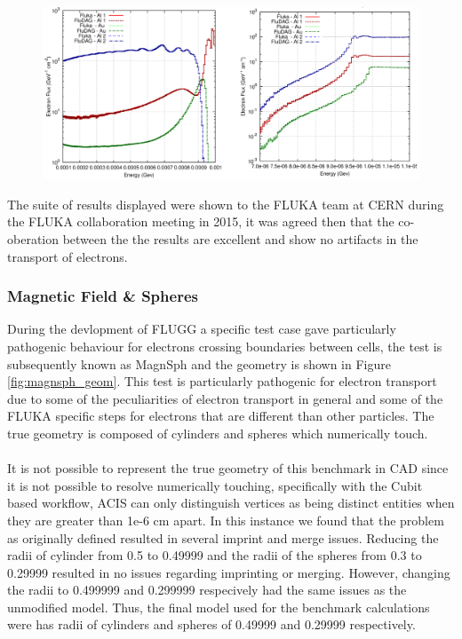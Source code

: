 \begin{figure}[ht!]
 \begin{centering}
 \centering
 \includegraphics[width=0.7\paperwidth]{../figs/alaual_spectra_log_log.png}
 \caption{}
 \label{fig:alaual_spectra_loglog}
 \end{centering}
\end{figure}

The suite of results displayed were shown to the FLUKA team at CERN during the FLUKA collaboration meeting
in 2015, it was agreed then that the co-oberation between the the results are excellent and show no artifacts
in the transport of electrons. 

\clearpage
\subsubsection{Magnetic Field \& Spheres}
During the devlopment of FLUGG a specific test case gave particularly pathogenic behaviour for electrons crossing
boundaries between cells, the test is subsequently known as MagnSph and the geometry is shown in Figure 
\ref{fig:magnsph_geom}. This test is particularly pathogenic for electron transport due to some of the peculiarities
of electron transport in general and some of the FLUKA specific steps for electrons that are different than other 
particles. The true geometry is composed of cylinders and spheres which numerically touch. 
\\
\\
It is not possible to represent the true geometry of this benchmark in CAD since it is not possible to resolve
numerically touching, specifically with the Cubit based workflow, ACIS can only distinguish vertices as being
distinct entities when they are greater than 1e-6 cm apart. In this instance we found that the problem as originally
defined resulted in several imprint and merge issues. Reducing the radii of cylinder from 0.5 to 0.49999 and the radii
of the spheres from 0.3 to 0.29999 resulted in no issues regarding imprinting or merging. However, changing the radii
to 0.499999 and 0.299999 respecively had the same issues as the unmodified model. Thus, the final model used for the
benchmark calculations were has radii of cylinders and spheres of 0.49999 and 0.29999 respectively.  

